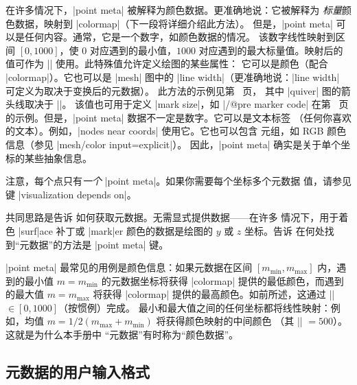 在许多情况下，|point meta| 被解释为颜色数据。更准确地说：它被解释为
\emph{标量}颜色数据，映射到 |colormap|（下一段将详细介绍此方法）。
但是，|point meta| 可以是任何内容。通常，它是一个数字，如颜色数据的情况。
该数字线性映射到区间 $[0,1000]$，使 $0$ 对应遇到的最小值，$1000$
对应遇到的最大标量值。映射后的值可作为
|\pgfplotspointmetatransformed| 使用。此特殊值允许定义绘图的某些属性：
它可以是颜色（配合 |colormap|）。它也可以是 |mesh| 图中的
|line width|（更准确地说：|line width| 可定义为取决于变换后的元数据）。
此方法的示例见第~\pageref{pgfplots:example:pointmeta:quiver} 页，
其中 |quiver| 图的箭头线取决于 |\pgfplotspointmetatransformed|。
该值也可用于定义 |mark size|，如
|\scatter/@pre marker code| 在第~\pageref{pgfplots:example:pointmeta:scatter}
页的示例。但是，|point meta| 数据不一定是数字。它可以是文本标签
（任何你喜欢的文本）。例如，|nodes near coords| 使用它。它也可以包含
元组，如 RGB 颜色信息（参见 |mesh/color input=explicit|）。
因此，|point meta| 确实是关于单个坐标的某些抽象信息。

注意，每个点只有\emph{一个} |point meta|。如果你需要每个坐标多个元数据
值，请参见键 |visualization depends on|。

共同思路是告诉 \PGFPlots{} 如何获取元数据。无需显式提供数据——在许多
情况下，用于着色 |surf|ace 补丁或 |mark|er 颜色的数据是绘图的 $y$ 或
$z$ 坐标。告诉 \PGFPlots{} 在何处找到``元数据''的方法是
|point meta| 键。

|point meta| 最常见的用例是颜色信息：如果元数据在区间
$[m_{\min},m_{\max}]$ 内，遇到的最小值 $m=m_{\min}$ 的元数据坐标将获得
|colormap| 提供的最低颜色，而遇到的最大值 $m=m_{\max}$ 将获得
|colormap| 提供的最高颜色。如前所述，这通过
|\pgfplotspointmetatransformed| $\in [0,1000]$（按惯例）完成。
最小和最大值之间的任何坐标都将线性映射：例如，均值
$m=1/2(m_{\max}+m_{\min})$ 将获得颜色映射的中间颜色
（其 |\pgfplotspointmetatransformed| $=500$）。这就是为什么本手册中
``元数据''有时称为``颜色数据''。

\begin{codeexample}[]
\end{codeexample}


\subsection{元数据的用户输入格式}

